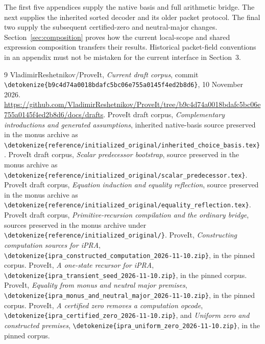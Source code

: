 \documentclass[11pt,letterpaper]{article}
\theoremstyle{definition}\newtheorem{definition}[theorem]{Definition}
\theoremstyle{remark}\newtheorem{remark}[theorem]{Remark}
\newcommand{\file}[1]{\expandafter\nolinkurl\expandafter{\detokenize{#1}}}
\begin{document}
The first five appendices supply the native basis and full arithmetic bridge.
The next supplies the inherited sorted decoder and its older packet protocol.
The final two supply the subsequent certified-zero and neutral-major changes.
Section~\ref{sec:composition} proves how the current local-scope and shared
expression composition transfers their results. Historical packet-field
conventions in an appendix must not be mistaken for the current interface in
Section~3.










\clearpage
\begin{thebibliography}{9}
 VladimirReshetnikov/ProveIt, \emph{Current draft corpus},
commit \file{b9c4d74a0018bdafc5bc06e755a0145f4ed2b8d6}, 10 November 2026.
\url{https://github.com/VladimirReshetnikov/ProveIt/tree/b9c4d74a0018bdafc5bc06e755a0145f4ed2b8d6/docs/drafts}.
 ProveIt draft corpus, \emph{Complementary introductions
and generated assumptions}, inherited native-basis source preserved in the
monus archive as \file{reference/initialized_original/inherited_choice_basis.tex}.
 ProveIt draft corpus, \emph{Scalar predecessor bootstrap},
source preserved in the monus archive as
\file{reference/initialized_original/scalar_predecessor.tex}.
 ProveIt draft corpus, \emph{Equation induction and equality
reflection}, source preserved in the monus archive as
\file{reference/initialized_original/equality_reflection.tex}.
 ProveIt draft corpus, \emph{Primitive-recursion compilation
and the ordinary bridge}, sources preserved in the monus archive under
\file{reference/initialized_original/}.
 ProveIt, \emph{Constructing computation sources for iPRA},
\file{ipra_constructed_computation_2026-11-10.zip}, in the pinned corpus.
 ProveIt, \emph{A one-state recursor for iPRA},
\file{ipra_transient_seed_2026-11-10.zip}, in the pinned corpus.
 ProveIt, \emph{Equality from monus and neutral major premises},
\file{ipra_monus_and_neutral_major_2026-11-10.zip}, in the pinned corpus.
 ProveIt, \emph{A certified zero removes a computation opcode},
\file{ipra_certified_zero_2026-11-10.zip}, and \emph{Uniform zero and constructed
premises}, \file{ipra_uniform_zero_2026-11-10.zip}, in the pinned corpus.
\end{thebibliography}
\end{document}
